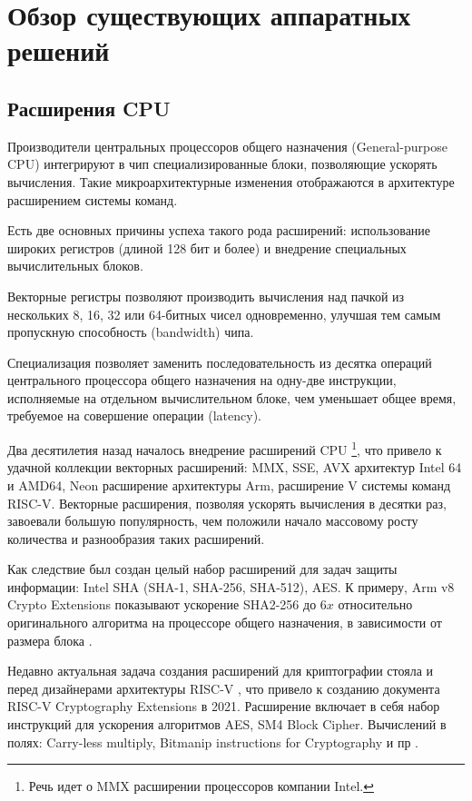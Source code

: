 \documentclass[a4paper,12pt]{article}
\begin{document}
\section{Обзор существующих аппаратных решений}

\subsection{Расширения CPU}

Производители центральных процессоров общего назначения (General-purpose CPU) интегрируют в чип специализированные блоки, позволяющие ускорять вычисления. Такие микроархитектурные изменения отображаются в архитектуре расширением системы команд.

Есть две основных причины успеха такого рода расширений: использование широких регистров (длиной 128 бит и более) и внедрение специальных вычислительных блоков. 

Векторные регистры позволяют производить вычисления над пачкой из нескольких 8, 16, 32 или 64-битных чисел одновременно, улучшая тем самым пропускную способность (bandwidth) чипа.

Специализация позволяет заменить последовательность из десятка операций центрального процессора общего назначения на одну-две инструкции, исполняемые на отдельном вычислительном блоке, чем уменьшает общее время, требуемое на совершение операции (latency).  

Два десятилетия назад началось внедрение расширений CPU \footnote{Речь идет о MMX расширении процессоров компании Intel.}, что привело к удачной коллекции векторных расширений: MMX, SSE, AVX архитектур Intel 64 и AMD64, Neon расширение архитектуры Arm, расширение V системы команд RISC-V. Векторные расширения, позволяя ускорять вычисления в десятки раз, завоевали большую популярность, чем положили начало массовому росту количества и разнообразия таких расширений.

Как следствие был создан целый набор расширений для задач защиты информации: Intel SHA (SHA-1, SHA-256, SHA-512), AES. К примеру, Arm v8 Crypto Extensions показывают ускорение SHA2-256 до $6x$ относительно оригинального алгоритма на процессоре общего назначения, в зависимости от размера блока \cite{AMD_VASoC}.

Недавно актуальная задача создания расширений для криптографии стояла и перед дизайнерами архитектуры RISC-V \cite{RISCV_AES}, что привело к созданию документа RISC-V Cryptography Extensions в 2021. Расширение включает в себя набор инструкций для ускорения алгоритмов AES, SM4 Block Cipher. Вычислений в полях: Carry-less multiply, Bitmanip instructions for Cryptography и пр \cite{RISCV_CRYPTO}. 
\end{document}
